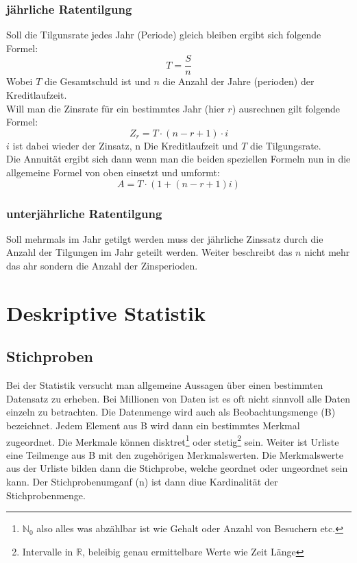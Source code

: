 \documentclass[a4paper]{scrartcl}
\begin{document}
            \subsubsection{jährliche Ratentilgung}
            Soll die Tilgunsrate jedes Jahr (Periode) gleich bleiben ergibt sich folgende Formel:
            \begin{equation*}
                T = \frac{S}{n}
            \end{equation*}
            Wobei \(T\) die Gesamtschuld ist und \(n\) die Anzahl der Jahre (perioden) der Kreditlaufzeit.\\
            Will man die Zinsrate für ein bestimmtes Jahr (hier \(r\)) ausrechnen gilt folgende Formel: 
            \begin{equation*}
                Z_r = T \cdot (n - r + 1) \cdot i
            \end{equation*} 
            \(i\) ist dabei wieder der Zinsatz, n Die Kreditlaufzeit und \(T\) die Tilgungsrate. \\
            Die Annuität ergibt sich dann wenn man die beiden speziellen Formeln nun in die allgemeine Formel von oben einsetzt und umformt: 
            \begin{equation*}
                A = T \cdot (1 + (n - r + 1)i)
            \end{equation*}

            \subsubsection{unterjährliche Ratentilgung}
            Soll mehrmals im Jahr getilgt werden muss der jährliche Zinssatz durch die Anzahl der Tilgungen im Jahr geteilt werden. Weiter beschreibt das \(n\) nicht mehr das ahr sondern die Anzahl
            der Zinsperioden.  
    \section{Deskriptive Statistik}
        \subsection{Stichproben}
            Bei der Statistik versucht man allgemeine Aussagen über einen bestimmten Datensatz zu erheben. Bei Millionen von Daten ist es oft nicht sinnvoll alle 
            Daten einzeln zu betrachten. Die Datenmenge wird auch als Beobachtungsmenge (B) bezeichnet. Jedem Element aus B wird dann ein bestimmtes Merkmal zugeordnet.
            Die Merkmale können disktret\footnote{\(\mathbb{N}_0\) also alles was abzählbar ist wie Gehalt oder Anzahl von Besuchern etc.} oder stetig\footnote{Intervalle in \(\mathbb{R}\), beleibig genau ermittelbare Werte
            wie Zeit Länge} sein. Weiter ist Urliste eine Teilmenge aus B mit den zugehörigen Merkmalswerten. Die Merkmalswerte aus der Urliste bilden dann die Stichprobe, welche 
            geordnet oder ungeordnet sein kann. Der Stichprobenumganf (n) ist dann diue Kardinalität der Stichprobenmenge.
\end{document}
